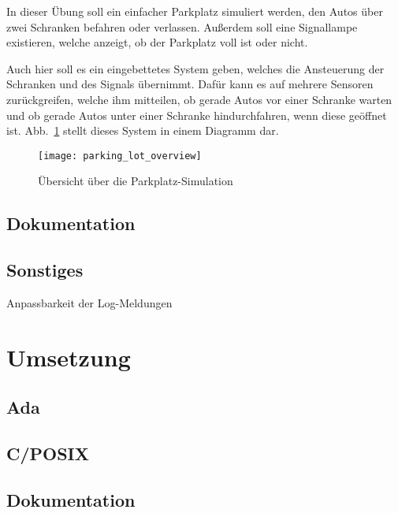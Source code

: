 \documentclass[oneside]{elaboration}
\begin{document}
In dieser Übung soll ein einfacher Parkplatz simuliert werden, den Autos
über zwei Schranken befahren oder verlassen. Außerdem soll eine Signallampe
existieren, welche anzeigt, ob der Parkplatz voll ist oder nicht.

Auch hier soll es ein eingebettetes System geben, welches die Ansteuerung der
Schranken und des Signals übernimmt. Dafür kann es auf mehrere Sensoren
zurückgreifen, welche ihm mitteilen, ob gerade Autos vor einer Schranke warten
und ob gerade Autos unter einer Schranke hindurchfahren, wenn diese geöffnet
ist. Abb.~\ref{fig:parking_lot_overview} stellt dieses System in einem Diagramm
dar.

\begin{figure}[hbt]
\centering
\texttt{[image: parking\_lot\_overview]}
\caption{Übersicht über die Parkplatz-Simulation}
\label{fig:parking_lot_overview}
\end{figure}



\section{Dokumentation}
\label{sec:dokumentation}

\section{Sonstiges}
\label{sec:sonstiges}

Anpassbarkeit der Log-Meldungen

\chapter{Umsetzung}
\label{chp:umsetzung}

\section{Ada}
\label{sec:ada}

\section{C/POSIX}
\label{sec:c/posix}

\section{Dokumentation}
\label{sec:dokumentation}
\end{document}
